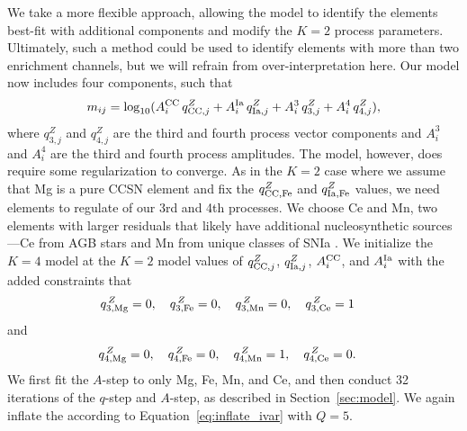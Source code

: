 \documentclass[modern]{aastex631}
\newcommand{\qcc}{q_{{\rm CC,}j}^{Z}}
\newcommand{\qccFe}{q_{{\rm CC, Fe}}^{Z}}
\newcommand{\qIa}{q_{{\rm Ia,}j}^{Z}}
\newcommand{\qIaFe}{q_{{\rm Ia,Fe}}^{Z}}
\newcommand{\Acc}{A^{\rm CC}_{i}}
\newcommand{\AIa}{A^{\rm Ia}_{i}}
\begin{document}
We take a more flexible approach, allowing the model to identify the elements best-fit with additional components and modify the $K=2$ process parameters. Ultimately, such a method could be used to identify elements with more than two enrichment channels, but we will refrain from over-interpretation here. Our model now includes four components, such that
\begin{equation}\label{eq:mij_4}
    m_{ij} = \log_{10}(\Acc\,\qcc + \AIa\,\qIa + A_{i}^{3}\,q_{3, j}^{Z} + A_{i}^{4}\,q_{4, j}^{Z}),
\end{equation}
where $q_{3, j}^{Z}$ and $q_{4, j}^{Z}$ are the third and fourth process vector components and $ A_{i}^3$ and $A_{i}^4$ are the third and fourth process amplitudes. The model, however, does require some regularization to converge. As in the $K=2$ case where we assume that Mg is a pure CCSN element and fix the $\qccFe$ and $\qIaFe$ values, we need elements to regulate of our 3rd and 4th processes. We choose Ce and Mn, two elements with larger residuals that likely have additional nucleosynthetic sources---Ce from AGB stars and Mn from unique classes of SNIa \citep[e.g.][]{gallino1998, reyes2020, gronow2021}. We initialize the $K=4$ model at the $K=2$ model values of $\qcc$, $\qIa$, $\Acc$, and $\AIa$ with the added constraints that 
\begin{equation}\label{eq:q3_z}
    q_{{\rm 3, Mg}}^{\,Z} = 0, \quad 
    q_{{\rm 3, Fe}}^{\,Z} = 0,  \quad 
    q_{{\rm 3, Mn}}^{\,Z} = 0, \quad 
    q_{{\rm 3, Ce}}^{\,Z} = 1 \quad 
\end{equation}
and 
\begin{equation}\label{eq:q4_z}
    q_{{\rm 4, Mg}}^{\,Z} = 0, \quad 
    q_{{\rm 4, Fe}}^{\,Z} = 0,  \quad 
    q_{{\rm 4, Mn}}^{\,Z} = 1, \quad 
    q_{{\rm 4, Ce}}^{\,Z} = 0. \quad 
\end{equation}
We first fit the $A$-step to only Mg, Fe, Mn, and Ce, and then conduct 32 iterations of the $q$-step and $A$-step, as described in Section~\ref{sec:model}. We again inflate the according to Equation~\ref{eq:inflate_ivar} with $Q=5$. 
\end{document}
